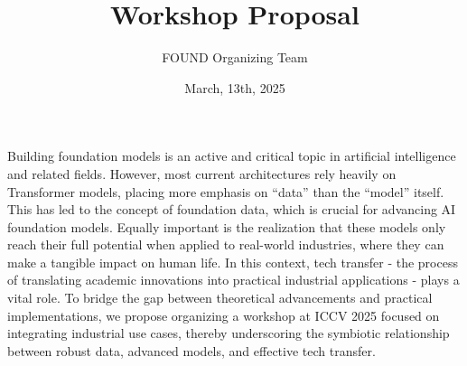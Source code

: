 \documentclass{article}
\title{\conf Workshop Proposal}
\author{FOUND Organizing Team}
\date{March, 13th, 2025}
\newcommand{\cYoshi}[1]{{\color{cyan}{#1}}} %
\def\c#1{\textcolor{gray}{#1}}
\def\x{\textcolor{red}{xxx}}
\begin{document}
\maketitle


Building foundation models is an active and critical topic in artificial intelligence and related fields. However, most current architectures rely heavily on Transformer models, placing more emphasis on ``data'' than the ``model'' itself. This has led to the concept of foundation data, which is crucial for advancing AI foundation models. Equally important is the realization that these models only reach their full potential when applied to real-world industries, where they can make a tangible impact on human life. In this context, tech transfer - the process of translating academic innovations into practical industrial applications - plays a vital role. To bridge the gap between theoretical advancements and practical implementations, we propose organizing a workshop at ICCV 2025 focused on integrating industrial use cases, thereby underscoring the symbiotic relationship between robust data, advanced models, and effective tech transfer.
\end{document}
